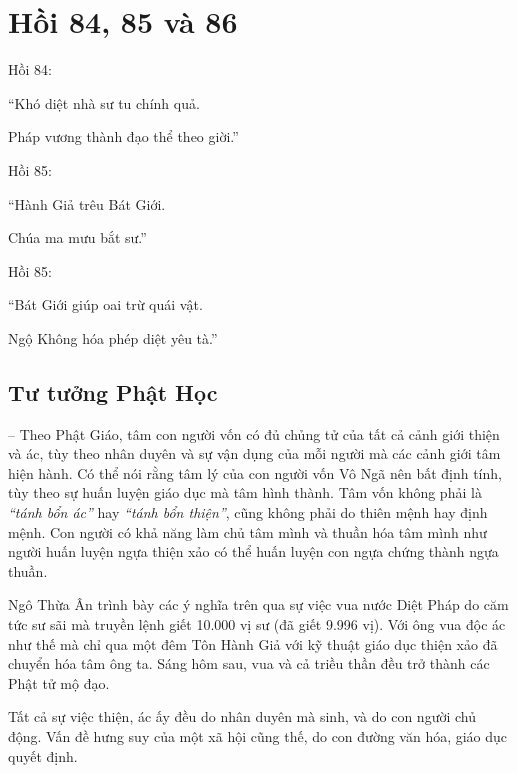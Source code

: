 \chapter{Hồi 84, 85 và 86} %
\label{cha:hoi_84_85}

Hồi 84:

\begin{itshape}
``Khó diệt nhà sư tu chính quả.

Pháp vương thành đạo thể theo giời.''
\end{itshape}

Hồi 85:

\begin{itshape}
``Hành Giả trêu Bát Giới.

Chúa ma mưu bắt sư.''
\end{itshape}

Hồi 85:

\begin{itshape}
``Bát Giới giúp oai trừ quái vật.

Ngộ Không hóa phép diệt yêu tà.''
\end{itshape}

\section{Tư tưởng Phật Học} %
\label{sec:84_85_phat_hoc}

-- Theo Phật Giáo, tâm con người vốn có đủ chủng tử của tất cả cảnh giới thiện và ác, tùy theo nhân duyên và sự vận dụng của mỗi người mà các cảnh giới tâm hiện hành. Có thể nói rằng tâm lý của con người vốn Vô Ngã nên bất định tính, tùy theo sự huấn luyện giáo dục mà tâm hình thành. Tâm vốn không phải là \emph{``tánh bổn ác''} hay \emph{``tánh bổn thiện''}, cũng không phải do thiên mệnh hay định mệnh. Con người có khả năng làm chủ tâm mình và thuần hóa tâm mình như người huấn luyện ngựa thiện xảo có thể huấn luyện con ngựa chứng thành ngựa thuần.

Ngô Thừa Ân trình bày các ý nghĩa trên qua sự việc vua nước Diệt Pháp do căm tức sư sãi mà truyền lệnh giết 10.000 vị sư (đã giết 9.996 vị). Với ông vua độc ác như thế mà chỉ qua một đêm Tôn Hành Giả với kỹ thuật giáo dục thiện xảo đã chuyển hóa tâm ông ta. Sáng hôm sau, vua và cả triều thần đều trở thành các Phật tử mộ đạo.

Tất cả sự việc thiện, ác ấy đều do nhân duyên mà sinh, và do con người chủ động. Vấn đề hưng suy của một xã hội cũng thế, do con đường văn hóa, giáo dục quyết định.

